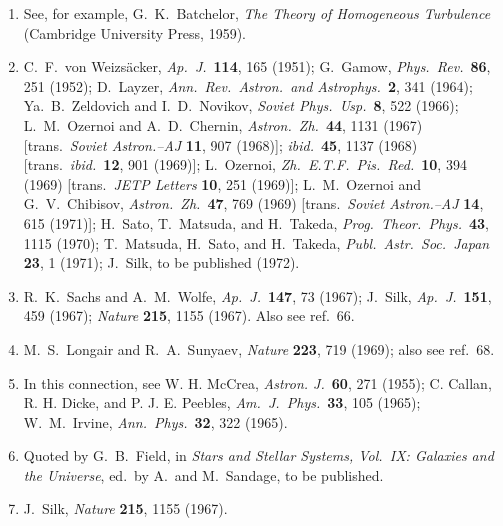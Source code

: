 \begin{enumerate}
  \item{}\label{ch15-ref-150}
  See, for example, G.~K.~Batchelor,
  \emph{The Theory of Homogeneous Turbulence}
  (Cambridge University Press, 1959).

  \item{}\label{ch15-ref-151}
  C.~F.~von Weizs\"acker, \emph{Ap.\ J.}\ \textbf{114}, 165 (1951);
  G.~Gamow, \emph{Phys.\ Rev.}\ \textbf{86}, 251 (1952);
  D.~Layzer, \emph{Ann.\ Rev.\ Astron.\ and Astrophys.}\ \textbf{2},
  341 (1964);
  Ya.~B.~Zeldovich and I.~D.~Novikov,
  \emph{Soviet Phys.\ Usp.}\ \textbf{8}, 522 (1966);
  L.~M.~Ozernoi and A.~D.~Chernin,
  \emph{Astron.\ Zh.}\ \textbf{44}, 1131 (1967)
  [trans.\ \emph{Soviet Astron.--AJ} \textbf{11}, 907 (1968)];
  \emph{ibid.}\ \textbf{45}, 1137 (1968)
  [trans.\ \emph{ibid.}\ \textbf{12}, 901 (1969)];
  L.~Ozernoi, \emph{Zh.\ E.T.F.\ Pis.\ Red.}\ \textbf{10}, 394 (1969)
  [trans.\ \emph{JETP Letters} \textbf{10}, 251 (1969)];
  L.~M.~Ozernoi and G.~V.~Chibisov,
  \emph{Astron.\ Zh.}\ \textbf{47}, 769 (1969)
  [trans.\ \emph{Soviet Astron.--AJ} \textbf{14}, 615 (1971)];
  H.~Sato, T.~Matsuda, and H.~Takeda,
  \emph{Prog.\ Theor.\ Phys.}\ \textbf{43}, 1115 (1970);
  T.~Matsuda, H.~Sato, and H.~Takeda,
  \emph{Publ.\ Astr.\ Soc.\ Japan} \textbf{23}, 1 (1971);
  J.~Silk, to be published (1972).

  \item{}\label{ch15-ref-152}
  R.~K.~Sachs and A.~M.~Wolfe,
  \emph{Ap.\ J.}\ \textbf{147}, 73 (1967);
  J.~Silk, \emph{Ap.\ J.}\ \textbf{151}, 459 (1967);
  \emph{Nature} \textbf{215}, 1155 (1967).
  Also see ref.~66.

  \item[152a.]\label{ch15-ref-152a}
  M.~S.~Longair and R.~A.~Sunyaev,
  \emph{Nature} \textbf{223}, 719 (1969); also see ref.~68.

  \item{}\label{ch15-ref-153}
  In this connection, see W. H. McCrea,
  \emph{Astron. J.}\ \textbf{60}, 271 (1955);
  C. Callan, R. H. Dicke, and P. J. E. Peebles,
  \emph{Am.\ J.\ Phys.}\ \textbf{33}, 105 (1965);
  W.~M.~Irvine, \emph{Ann.\ Phys.}\ \textbf{32}, 322 (1965).

  \item{}\label{ch15-ref-154}
  Quoted by G.~B.~Field, in
  \emph{Stars and Stellar Systems, Vol.\ IX: Galaxies and the Universe},
  ed.\ by A.\ and M.~Sandage, to be published.

  \item{}\label{ch15-ref-155}
  J.~Silk, \emph{Nature} \textbf{215}, 1155 (1967).


\end{enumerate}
